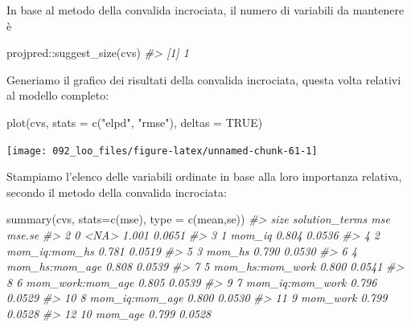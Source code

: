 \documentclass[
  10pt,
  italian,
  a4paper,
  extrafontsizes,onecolumn,openright
  ]{memoir}
\newenvironment{Shaded}{\begin{snugshade}}{\end{snugshade}}
\newcommand{\AttributeTok}[1]{\textcolor[rgb]{0.77,0.63,0.00}{#1}}
\newcommand{\CommentTok}[1]{\textcolor[rgb]{0.56,0.35,0.01}{\textit{#1}}}
\newcommand{\ConstantTok}[1]{\textcolor[rgb]{0.00,0.00,0.00}{#1}}
\newcommand{\FunctionTok}[1]{\textcolor[rgb]{0.00,0.00,0.00}{#1}}
\newcommand{\NormalTok}[1]{#1}
\newcommand{\SpecialCharTok}[1]{\textcolor[rgb]{0.00,0.00,0.00}{#1}}
\newcommand{\StringTok}[1]{\textcolor[rgb]{0.31,0.60,0.02}{#1}}
\theoremstyle{definition}
\theoremstyle{definition}
\theoremstyle{definition}
\theoremstyle{definition}
\theoremstyle{remark}
\begin{document}
\noindent
In base al metodo della convalida incrociata, il numero di variabili da mantenere è

\begin{Shaded}
\begin{Highlighting}[]
\NormalTok{projpred}\SpecialCharTok{::}\FunctionTok{suggest\_size}\NormalTok{(cvs)}
\CommentTok{\#\textgreater{} [1] 1}
\end{Highlighting}
\end{Shaded}

\noindent
Generiamo il grafico dei risultati della convalida incrociata, questa volta relativi al modello completo:

\begin{Shaded}
\begin{Highlighting}[]
\FunctionTok{plot}\NormalTok{(cvs, }\AttributeTok{stats =} \FunctionTok{c}\NormalTok{(}\StringTok{"elpd"}\NormalTok{, }\StringTok{"rmse"}\NormalTok{), }\AttributeTok{deltas =} \ConstantTok{TRUE}\NormalTok{)}
\end{Highlighting}
\end{Shaded}

\begin{center}\texttt{[image: 092\_loo\_files/figure-latex/unnamed-chunk-61-1]} \end{center}

\noindent
Stampiamo l'elenco delle variabili ordinate in base alla loro importanza relativa, secondo il metodo della convalida incrociata:

\begin{Shaded}
\begin{Highlighting}[]
\FunctionTok{summary}\NormalTok{(cvs, }\AttributeTok{stats=}\FunctionTok{c}\NormalTok{(}\StringTok{\textquotesingle{}mse\textquotesingle{}}\NormalTok{), }\AttributeTok{type =} \FunctionTok{c}\NormalTok{(}\StringTok{\textquotesingle{}mean\textquotesingle{}}\NormalTok{,}\StringTok{\textquotesingle{}se\textquotesingle{}}\NormalTok{))}
\CommentTok{\#\textgreater{}    size   solution\_terms   mse mse.se}
\CommentTok{\#\textgreater{} 2     0             \textless{}NA\textgreater{} 1.001 0.0651}
\CommentTok{\#\textgreater{} 3     1           mom\_iq 0.804 0.0536}
\CommentTok{\#\textgreater{} 4     2    mom\_iq:mom\_hs 0.781 0.0519}
\CommentTok{\#\textgreater{} 5     3           mom\_hs 0.790 0.0530}
\CommentTok{\#\textgreater{} 6     4   mom\_hs:mom\_age 0.808 0.0539}
\CommentTok{\#\textgreater{} 7     5  mom\_hs:mom\_work 0.800 0.0541}
\CommentTok{\#\textgreater{} 8     6 mom\_work:mom\_age 0.805 0.0539}
\CommentTok{\#\textgreater{} 9     7  mom\_iq:mom\_work 0.796 0.0529}
\CommentTok{\#\textgreater{} 10    8   mom\_iq:mom\_age 0.800 0.0530}
\CommentTok{\#\textgreater{} 11    9         mom\_work 0.799 0.0528}
\CommentTok{\#\textgreater{} 12   10          mom\_age 0.799 0.0528}
\end{Highlighting}
\end{Shaded}
\end{document}
